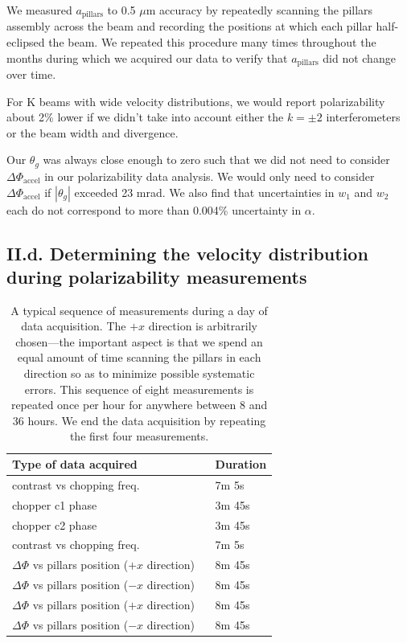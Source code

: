 \documentclass[twocolumn,prl,showpacs,superscriptaddress]{revtex4-1}   %
\newcommand{\sspace}{$\enspace$}
\newcommand{\dphiaccel}{\Delta\Phi_{\mathrm{accel}}}
\begin{document}
We measured $a_{\mathrm{pillars}}$ to 0.5 $\mu$m accuracy by repeatedly scanning the pillars assembly across the beam and recording the positions at which each pillar half-eclipsed the beam. 
We repeated this procedure many times throughout the months during which we acquired our data to verify that $a_{\mathrm{pillars}}$ did not change over time. 

For K beams with wide velocity distributions, we would report polarizability about 2\% lower if we didn't take into account either the $k=\pm 2$ interferometers or the beam width and divergence.

Our $\theta_g$ was always close enough to zero such that we did not need to consider $\dphiaccel$ in our polarizability data analysis. We would only need to consider $\dphiaccel$ if $|\theta_g|$ exceeded 23 mrad.
We also find that uncertainties in $w_1$ and $w_2$ each do not correspond to more than 0.004\% uncertainty in $\alpha$.

\subsection{II.d. Determining the velocity distribution during polarizability measurements}

\begingroup
\begin{table}
\caption{\label{schedule}A typical sequence of measurements during a day of data acquisition. The $+x$ direction is arbitrarily chosen---the important aspect is that we spend an equal amount of time scanning the pillars in each direction so as to minimize possible systematic errors. This sequence of eight measurements is repeated once per hour for anywhere between 8 and 36 hours. We end the data acquisition by repeating the first four measurements.}
\begin{center}
\begin{tabular}{l l}
\hline
\hline
Type of data acquired & Duration \\
\hline
contrast vs chopping freq. & 7m 5s \\
chopper c1 phase & 3m 45s \\
chopper c2 phase & 3m 45s\\
contrast vs chopping freq. & 7m 5s \\
$\Delta\Phi$ vs pillars position ($+x$ direction) \sspace & 8m 45s \\
$\Delta\Phi$ vs pillars position ($-x$ direction) & 8m 45s \\
$\Delta\Phi$ vs pillars position ($+x$ direction) & 8m 45s \\
$\Delta\Phi$ vs pillars position ($-x$ direction) & 8m 45s \\
\hline
\hline
\end{tabular}
\end{center}
\end{table}
\endgroup
\end{document}
